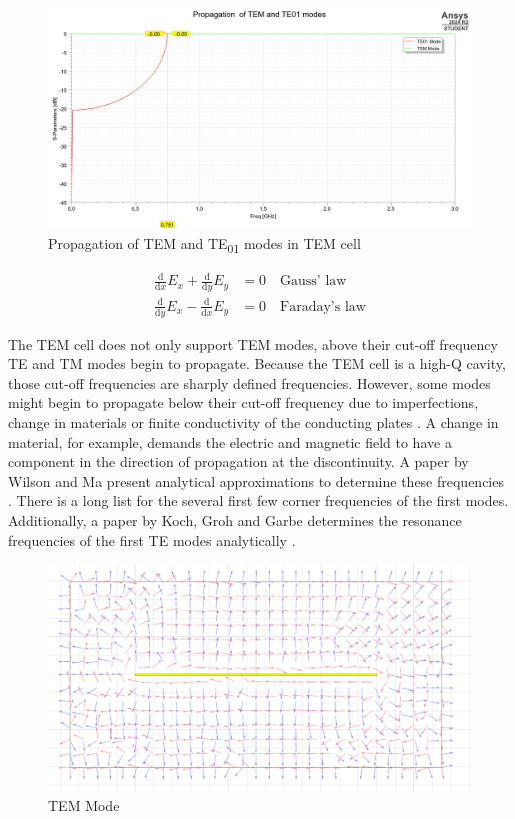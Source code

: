\begin{figure}[h]
    \centering
    \includegraphics[width=1\linewidth]{Documentation//content//10_theory//img/te01_tem_modes_propagation.png}
    \caption{Propagation of TEM and TE\textsubscript{01} modes in TEM cell}
    \label{fig:te01_tem_modes_propagation}
\end{figure}


\begin{align}
    \frac{\mathrm{d}}{\mathrm{d}x}E_x+\frac{\mathrm{d}}{\mathrm{d}y}E_y&=0\quad\text{Gauss' law}\label{eqn:rect_waveguide_gauss}\\
    \frac{\mathrm{d}}{\mathrm{d}y}E_x-\frac{\mathrm{d}}{\mathrm{d}x}E_y&=0\quad\text{Faraday's law}\label{eqn:rect_waveguide_faraday}
\end{align}


The TEM cell does not only support TEM modes, above their cut-off frequency TE and TM modes begin to propagate. Because the TEM cell is a high-Q cavity, those cut-off frequencies are sharply defined frequencies. However, some modes might begin to propagate below their cut-off frequency due to imperfections, change in materials or finite conductivity of the conducting plates \cite{10791592}. A change in material, for example, demands the electric and magnetic field to have a component in the direction of propagation at the discontinuity. A paper by Wilson and Ma present analytical approximations to determine these frequencies \cite{Wilson_Ma_1986}.  There is a long list for the several first few corner frequencies of the first modes. Additionally, a paper by Koch, Groh and Garbe determines the resonance frequencies of the first TE modes analytically \cite{10791592}.

\begin{figure}[h]
    \centering
    \includegraphics[width=0.5\linewidth]{images/tem_mode.png}
    \caption{TEM Mode}
    \label{fig:tem_mode}
\end{figure}

